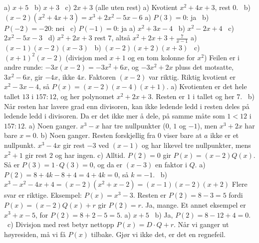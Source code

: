 
 a) $x + 5$ \ b) $x + 3$ \ c) $2x + 3$ (alle uten rest)
 a) Kvotient $x^2 + 4x + 3$, rest $0$. \ b) $(x-2)(x^2 + 4x + 3) = x^3 + 2x^2 - 5x - 6$
 a) $P(3) = 0$: ja \ b) $P(-2) = -20$: nei \ c) $P(-1) = 0$: ja
 a) $x^2 + 3x - 4$ \ b) $x^2 - 2x + 4$ \ c) $2x^2 - 5x - 3$ \ d) $x^2 + 2x + 3$ rest $7$, altså $x^2 + 2x + 3 + \frac{7}{x-1}$
 a) $(x-1)(x-2)(x-3)$ \ b) $(x-2)(x+2)(x+3)$ \ c) $(x+1)^2(x-2)$ (divisjon med $x + 1$ og en tom kolonne for $x^2$)
 Feilen er i andre runde: $-3x(x-2) = -3x^2 + 6x$, og $-3x^2 + 2x$ pluss det motsatte, $3x^2 - 6x$, gir $-4x$, ikke $4x$. Faktoren $(x-2)$ var riktig. Riktig kvotient er $x^2 - 3x - 4$, så $P(x) = (x-2)(x-4)(x+1)$.
 a) Kvotienten er det hele tallet $13$ i $157 : 12$, og her polynomet $x^2 + 2x + 3$. Resten er $1$ i tallet og her $7$. \ b) Når resten har lavere grad enn divisoren, kan ikke ledende ledd i resten deles på ledende ledd i divisoren. Da er det ikke mer å dele, på samme måte som $1 < 12$ i $157 : 12$.
 a) Noen ganger. $x^3 - x$ har tre nullpunkter ($0$, $1$ og $-1$), men $x^3 + 2x$ har bare $x = 0$.
b) Noen ganger. Resten forskjellig fra $0$ viser bare at $a$ ikke er et nullpunkt. $x^3 - 4x$ gir rest $-3$ ved $(x-1)$ og har likevel tre nullpunkter, mens $x^2 + 1$ gir rest $2$ og har ingen.
c) Alltid. $P(2) = 0$ gir $P(x) = (x-2)Q(x)$. Så er $P(3) = 1 \cdot Q(3) = 0$, og da er $(x-3)$ en faktor i $Q$.
 a) $P(2) = 8 + 4k - 8 + 4 = 4 + 4k = 0$, så $k = -1$. \ b) $x^3 - x^2 - 4x + 4 = (x-2)(x^2 + x - 2) = (x-1)(x-2)(x+2)$
 Flere svar er riktige. Eksempel: $P(x) = x^3 - 3$. Resten er $P(2) = 8 - 3 = 5$ fordi $P(x) = (x-2)Q(x) + r$ gir $P(2) = r$. Ja, mange. Et annet eksempel er $x^3 + x - 5$, for $P(2) = 8 + 2 - 5 = 5$.
 a) $x + 5$ \ b) Ja, $P(2) = 8 - 12 + 4 = 0$. \ c) Divisjon med rest betyr nettopp $P(x) = D \cdot Q + r$. Når vi ganger ut høyresiden, må vi få $P(x)$ tilbake. Gjør vi ikke det, er det en regnefeil.

